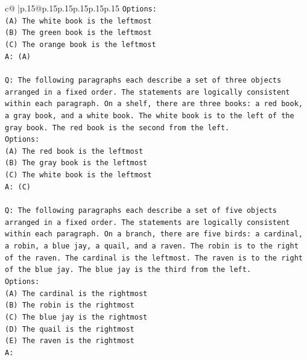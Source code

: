 \documentclass{article}
\begin{document}
{\begin{supertabular}{c@{$\;$}|p{.15\linewidth}@{}p{.15\linewidth}p{.15\linewidth}p{.15\linewidth}p{.15\linewidth}p{.15\linewidth}}
{{{\texttt{Options:} \\
\texttt{(A) The white book is the leftmost} \\
\texttt{(B) The green book is the leftmost} \\
\texttt{(C) The orange book is the leftmost} \\
\texttt{A: (A)} \\
\\ 
\texttt{Q: The following paragraphs each describe a set of three objects arranged in a fixed order. The statements are logically consistent within each paragraph. On a shelf, there are three books: a red book, a gray book, and a white book. The white book is to the left of the gray book. The red book is the second from the left.} \\
\texttt{Options:} \\
\texttt{(A) The red book is the leftmost} \\
\texttt{(B) The gray book is the leftmost} \\
\texttt{(C) The white book is the leftmost} \\
\texttt{A: (C)} \\
\\ 
\texttt{Q: The following paragraphs each describe a set of five objects arranged in a fixed order. The statements are logically consistent within each paragraph. On a branch, there are five birds: a cardinal, a robin, a blue jay, a quail, and a raven. The robin is to the right of the raven. The cardinal is the leftmost. The raven is to the right of the blue jay. The blue jay is the third from the left.} \\
\texttt{Options:} \\
\texttt{(A) The cardinal is the rightmost} \\
\texttt{(B) The robin is the rightmost} \\
\texttt{(C) The blue jay is the rightmost} \\
\texttt{(D) The quail is the rightmost} \\
\texttt{(E) The raven is the rightmost} \\
\texttt{A:} \\
            }
        }
    }
     \\ \\


\end{supertabular}}
\end{document}
